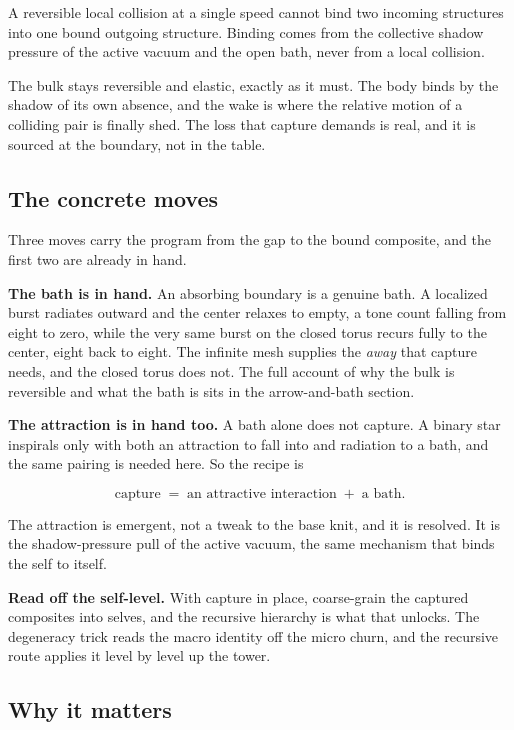 \begin{theorem}
A reversible local collision at a single speed cannot bind two incoming structures into one bound outgoing structure. Binding comes from the collective shadow pressure of the active vacuum and the open bath, never from a local collision.
\end{theorem}

The bulk stays reversible and elastic, exactly as it must. The body binds by the shadow of its own absence, and the wake is where the relative motion of a colliding pair is finally shed. The loss that capture demands is real, and it is sourced at the boundary, not in the table.

\subsection{The concrete moves}

Three moves carry the program from the gap to the bound composite, and the first two are already in hand.

\textbf{The bath is in hand.} An absorbing boundary is a genuine bath. A localized burst radiates outward and the center relaxes to empty, a tone count falling from eight to zero, while the very same burst on the closed torus recurs fully to the center, eight back to eight. The infinite mesh supplies the \emph{away} that capture needs, and the closed torus does not. The full account of why the bulk is reversible and what the bath is sits in the arrow-and-bath section.

\textbf{The attraction is in hand too.} A bath alone does not capture. A binary star inspirals only with both an attraction to fall into and radiation to a bath, and the same pairing is needed here. So the recipe is

\[
\text{capture} \;=\; \text{an attractive interaction} \;+\; \text{a bath}.
\]

The attraction is emergent, not a tweak to the base knit, and it is resolved. It is the shadow-pressure pull of the active vacuum, the same mechanism that binds the self to itself.

\textbf{Read off the self-level.} With capture in place, coarse-grain the captured composites into selves, and the recursive hierarchy is what that unlocks. The degeneracy trick reads the macro identity off the micro churn, and the recursive route applies it level by level up the tower.

\subsection{Why it matters}

